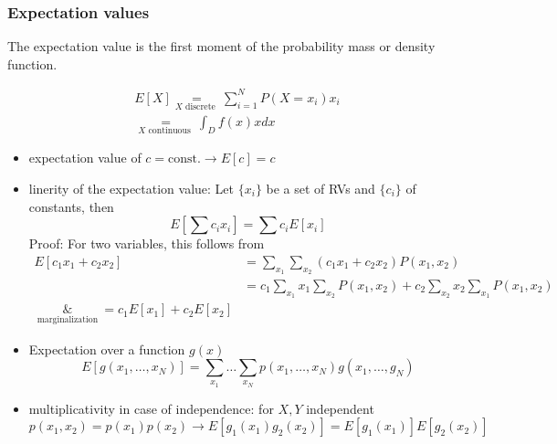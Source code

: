\subsubsection{Expectation values}
The expectation value is the first moment of the probability mass or density
function.

\begin{equation}
    \begin{gathered}
    E[X] \underset{X \text { discrete }}{=} \sum_{i=1}^N P\left(X=x_i\right) x_i \\
    \underset{X \text { continuous }}{=} \int_D f(x) x d x
    \end{gathered}
\end{equation}

\begin{itemize}
    \item expectation value of $c = \text{const.} \rightarrow E[c] = c$
    \item linerity of the expectation value: Let $\{x_i\}$ be a set
    of RVs and $\{c_i\}$ of constants, then
    \begin{equation}
        E\left[\sum c_i x_i\right]=\sum c_i E\left[x_i\right]
    \end{equation}
    \textcolor{blue1}{Proof}: For two variables, this follows from
    \begin{equation}
        \begin{aligned}
        E\left[c_1 x_1+c_2 x_2\right]&=\sum_{x_1} \sum_{x_2}\left(c_1 x_1+c_2 x_2\right) P\left(x_1, x_2\right) \\
                                     &=c_1 \sum_{x_1} x_1 \sum_{x_2} P\left(x_1, x_2\right)+c_2 \sum_{x_2} x_2 \sum_{x_1} P\left(x_1, x_2\right) \\
                                    \underset{\text { marginalization }}&= c_1 E\left[x_1\right]+c_2 E\left[x_2\right]
        \end{aligned}
    \end{equation}
    \item Expectation over a function $g(x)$
    \begin{equation}
        E\left[g\left(x_1, \ldots, x_N\right)\right]=\sum_{x_1} \ldots \sum_{x_N} p\left(x_1, \ldots, x_N\right) g\left(x_1, \ldots, g_N\right)
    \end{equation}
    \item multiplicativity in case of independence: for $X,Y$ independent
    \begin{equation}
        p\left(x_1, x_2\right)=p\left(x_1\right) p\left(x_2\right) \rightarrow E\left[g_1\left(x_1\right) g_2\left(x_2\right)\right]=E\left[g_1\left(x_1\right)\right] E\left[g_2\left(x_2\right)\right]
    \end{equation}
\end{itemize}

